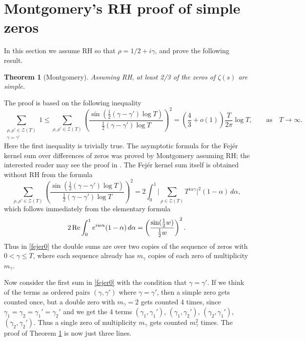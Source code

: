 \documentclass[11pt]{amsart}
\newtheorem{theorem}{Theorem}%
\theoremstyle{remark}
\theoremstyle{plain}
\numberwithin{equation}{section}
\begin{document}

\section{Montgomery's RH proof of simple zeros} 

In this section we assume RH so that $\rho= 1/2+i\gamma $, and prove the following result.
\begin{theorem}[Montgomery] \label{thm1} Assuming RH, at least 2/3 of the zeros of $\zeta(s)$ are simple. \end{theorem}
The proof is based on the following inequality
\begin{equation}\label{fejer0}
\sum_{\substack{\rho,\rho' \in \mathcal{Z}(T)\\ \gamma=\gamma'}}1 \le \sum_{\rho,\rho' \in \mathcal{Z}(T)} \left(\frac{\sin (\frac12 (\gamma-\gamma')\log{T})}{\frac12 (\gamma-\gamma')\log{T}}\right)^2 
= \left(\frac43+o(1)\right) \frac{T}{2\pi}\log{T},\qquad \text{as}
\quad T\to\infty.
\end{equation}
Here the first inequality is trivially true. The asymptotic formula for the Fej{\'e}r kernel sum over differences of zeros was proved by Montgomery assuming RH; the interested reader may see the proof in \cite{Montgomery73}. The Fej{\'e}r kernel sum itself is obtained without RH from the formula 
\begin{equation} \label{fejer1} \sum_{\rho,\rho' \in \mathcal{Z}(T)} \left(\frac{\sin (\frac12 (\gamma-\gamma')\log{T})}{\frac12 (\gamma-\gamma')\log{T}}\right)^2 = 2\int_0^1 \bigg|\sum_{\rho\in \mathcal{Z}(T)}T^{i\alpha \gamma} \bigg|^2 (1-\alpha) \, d\alpha ,\end{equation} 
which follows immediately from the elementary formula
\begin{equation}\label{fejer2} 2\, {\rm Re}\int_0^1e^{iw\alpha} (1-\alpha) \, d\alpha = \left(\frac{\sin(\frac{1}{2}w)}{\frac12 w }\right)^2.\end{equation}
Thus in \eqref{fejer0} the double sums are over two copies of the sequence of zeros with $0<\gamma \le T$, where each sequence already has $m_\gamma$ copies of each zero of multiplicity $m_\gamma$.

Now consider the first sum in \eqref{fejer0} with the condition that $\gamma=\gamma'$. If we think of the terms as ordered pairs $(\gamma, \gamma')$ where $\gamma=\gamma'$, then a simple zero gets counted once, but a double zero with $m_\gamma =2$ gets counted 4 times, since $\gamma_1=\gamma_2 = \gamma_1'=\gamma_2'$ and we get the 4 terms $(\gamma_1,\gamma_1')$, $(\gamma_1,\gamma_2')$, $(\gamma_2,\gamma_1')$, $(\gamma_2,\gamma_2')$. Thus a single zero of multiplicity $m_\gamma$ gets counted $m_\gamma^2$ times. The proof of Theorem \ref{thm1} is now just three lines.
\end{document}

